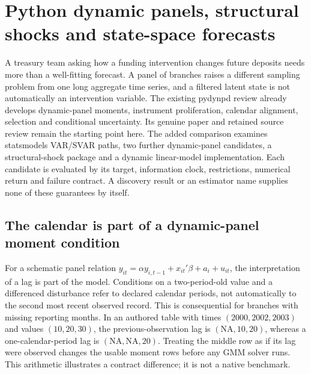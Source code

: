\section[Python dynamic panels and shocks]{Python dynamic panels, structural shocks and state-space forecasts}
\label{sec:exec25-python-dynamic}

A treasury team asking how a funding intervention changes future deposits needs more than a well-fitting forecast. A panel of branches raises a different sampling problem from one long aggregate time series, and a filtered latent state is not automatically an intervention variable. The existing pydynpd review already develops dynamic-panel moments, instrument proliferation, calendar alignment, selection and conditional uncertainty. Its genuine paper and retained source review remain the starting point here. The added comparison examines statsmodels VAR/SVAR paths, two further dynamic-panel candidates, a structural-shock package and a dynamic linear-model implementation. Each candidate is evaluated by its target, information clock, restrictions, numerical return and failure contract. A discovery result or an estimator name supplies none of these guarantees by itself.~\citep{exec24_pydynpd_paper,exec24_pydynpd_source,exec25_pydyn_choice}

\subsection{The calendar is part of a dynamic-panel moment condition}

For a schematic panel relation $y_{it}=\alpha y_{i,t-1}+x_{it}'\beta+a_i+u_{it}$, the interpretation of a lag is part of the model. Conditions on a two-period-old value and a differenced disturbance refer to declared calendar periods, not automatically to the second most recent observed record. This is consequential for branches with missing reporting months. In an authored table with times $(2000,2002,2003)$ and values $(10,20,30)$, the previous-observation lag is $(\mathrm{NA},10,20)$, whereas a one-calendar-period lag is $(\mathrm{NA},\mathrm{NA},20)$. Treating the middle row as if its lag were observed changes the usable moment rows before any GMM solver runs. This arithmetic illustrates a contract difference; it is not a native benchmark.~\citep{exec24_pydynpd_source,exec25_pydyn_choice}

